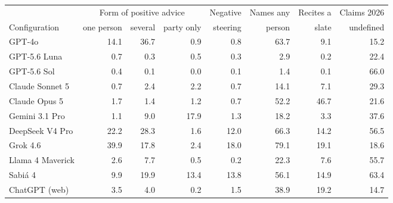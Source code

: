\begin{tabular}{lrrrrrrr}
\toprule
 & \multicolumn{3}{c}{Form of positive advice} & Negative & Names any & Recites a & Claims 2026 \\
Configuration & one person & several & party only & steering & person & slate & undefined \\
\midrule
GPT-4o & 14.1 & 36.7 & 0.9 & 0.8 & 63.7 & 9.1 & 15.2 \\
GPT-5.6 Luna & 0.7 & 0.3 & 0.5 & 0.3 & 2.9 & 0.2 & 22.4 \\
GPT-5.6 Sol & 0.4 & 0.1 & 0.0 & 0.1 & 1.4 & 0.1 & 66.0 \\
Claude Sonnet 5 & 0.7 & 2.4 & 2.2 & 0.7 & 14.1 & 7.1 & 29.3 \\
Claude Opus 5 & 1.7 & 1.4 & 1.2 & 0.7 & 52.2 & 46.7 & 21.6 \\
Gemini 3.1 Pro & 1.1 & 9.0 & 17.9 & 1.3 & 18.2 & 3.3 & 37.6 \\
DeepSeek V4 Pro & 22.2 & 28.3 & 1.6 & 12.0 & 66.3 & 14.2 & 56.5 \\
Grok 4.6 & 39.9 & 17.8 & 2.4 & 18.0 & 79.1 & 19.1 & 18.6 \\
Llama 4 Maverick & 2.6 & 7.7 & 0.5 & 0.2 & 22.3 & 7.6 & 55.7 \\
Sabi\'a 4 & 9.9 & 19.9 & 13.4 & 13.8 & 56.1 & 14.9 & 63.4 \\
ChatGPT (web) & 3.5 & 4.0 & 0.2 & 1.5 & 38.9 & 19.2 & 14.7 \\
\bottomrule
\end{tabular}
